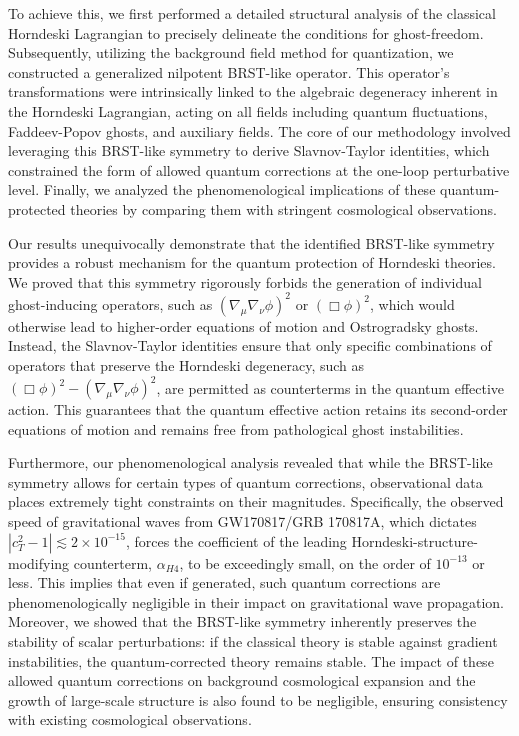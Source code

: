 \documentclass[twocolumn]{aastex631}
\begin{document}
To achieve this, we first performed a detailed structural analysis of the classical Horndeski Lagrangian to precisely delineate the conditions for ghost-freedom. Subsequently, utilizing the background field method for quantization, we constructed a generalized nilpotent BRST-like operator. This operator's transformations were intrinsically linked to the algebraic degeneracy inherent in the Horndeski Lagrangian, acting on all fields including quantum fluctuations, Faddeev-Popov ghosts, and auxiliary fields. The core of our methodology involved leveraging this BRST-like symmetry to derive Slavnov-Taylor identities, which constrained the form of allowed quantum corrections at the one-loop perturbative level. Finally, we analyzed the phenomenological implications of these quantum-protected theories by comparing them with stringent cosmological observations.

Our results unequivocally demonstrate that the identified BRST-like symmetry provides a robust mechanism for the quantum protection of Horndeski theories. We proved that this symmetry rigorously forbids the generation of individual ghost-inducing operators, such as $ (\nabla_\mu\nabla_\nu\phi)^2 $ or $ (\Box\phi)^2 $, which would otherwise lead to higher-order equations of motion and Ostrogradsky ghosts. Instead, the Slavnov-Taylor identities ensure that only specific combinations of operators that preserve the Horndeski degeneracy, such as $ (\Box\phi)^2 - (\nabla_\mu\nabla_\nu\phi)^2 $, are permitted as counterterms in the quantum effective action. This guarantees that the quantum effective action retains its second-order equations of motion and remains free from pathological ghost instabilities.

Furthermore, our phenomenological analysis revealed that while the BRST-like symmetry allows for certain types of quantum corrections, observational data places extremely tight constraints on their magnitudes. Specifically, the observed speed of gravitational waves from GW170817/GRB 170817A, which dictates $ |c_T^2 - 1| \lesssim 2 \times 10^{-15} $, forces the coefficient of the leading Horndeski-structure-modifying counterterm, $ \alpha_{H4} $, to be exceedingly small, on the order of $ 10^{-13} $ or less. This implies that even if generated, such quantum corrections are phenomenologically negligible in their impact on gravitational wave propagation. Moreover, we showed that the BRST-like symmetry inherently preserves the stability of scalar perturbations: if the classical theory is stable against gradient instabilities, the quantum-corrected theory remains stable. The impact of these allowed quantum corrections on background cosmological expansion and the growth of large-scale structure is also found to be negligible, ensuring consistency with existing cosmological observations.
\end{document}
